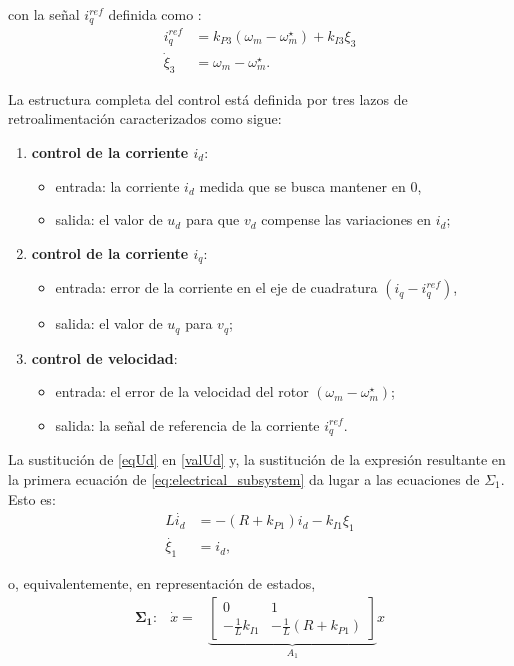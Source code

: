 {con la señal $i_q^{ref}$ definida como :
\begin{equation}\label{xi}
\begin{aligned}
i_{q}^{ref} &= k_{P3}(\omega_m - \omega_m^\star) + k_{I3}\xi_3 \\
\dot{\xi}_3 &= \omega_m - \omega_m^\star.
\end{aligned}
\end{equation}

La estructura completa del control está definida por tres lazos de retroalimentación caracterizados
como sigue:

\begin{enumerate}
    \item \textbf{control de la corriente $i_d$}: \begin{itemize}
        \item entrada: la corriente $i_d$ medida que se busca mantener en 0,
        \item salida: el valor de $u_d$ para que $v_d$ compense las variaciones en $i_d$;
    \end{itemize}
    \item \textbf{control de la corriente $i_q$}: \begin{itemize}
        \item entrada: error de la corriente en el eje de cuadratura $(i_q - i_q^{ref})$,
        \item salida: el valor de $u_q$ para $v_q$;
    \end{itemize}
    \item \textbf{control de velocidad}: \begin{itemize}
        \item entrada: el error de la velocidad del rotor $(\omega_m - \omega_m^\star)$;
        \item salida: la señal de referencia de la corriente $i_q^{ref}$.
    \end{itemize}
\end{enumerate}

La sustitución de \eqref{eqUd} en \eqref{valUd} y, la sustitución de la expresión resultante en la primera
ecuación de \eqref{eq:electrical_subsystem} da lugar a las ecuaciones de $\Sigma_1$. Esto es:
\begin{align}
    L\dot{i_d} &= -(R+k_{P1})i_d - k_{I1}\xi_1\\
    \dot{\xi_1} &= i_d,
\end{align}

o, equivalentemente, en representación de estados,
\begin{align}
    \mathbf{\Sigma_1:}\;\;\: \dot x= & \underbrace{\begin{bmatrix}0&1\\  -\frac{1}{L}k_{I1} & -\frac{1}{L}(R+k_{P1}) 
    \end{bmatrix}}_{A_1}x
 \end{align}

}
